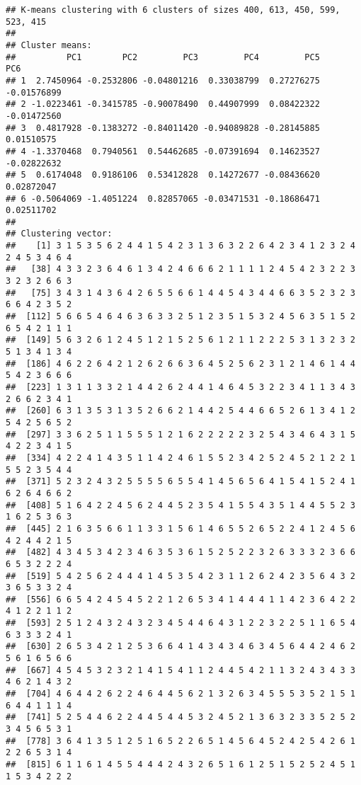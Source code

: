 \documentclass[
]{article}
\begin{document}
\begin{verbatim}
## K-means clustering with 6 clusters of sizes 400, 613, 450, 599, 523, 415
## 
## Cluster means:
##          PC1        PC2         PC3         PC4         PC5         PC6
## 1  2.7450964 -0.2532806 -0.04801216  0.33038799  0.27276275 -0.01576899
## 2 -1.0223461 -0.3415785 -0.90078490  0.44907999  0.08422322 -0.01472560
## 3  0.4817928 -0.1383272 -0.84011420 -0.94089828 -0.28145885  0.01510575
## 4 -1.3370468  0.7940561  0.54462685 -0.07391694  0.14623527 -0.02822632
## 5  0.6174048  0.9186106  0.53412828  0.14272677 -0.08436620  0.02872047
## 6 -0.5064069 -1.4051224  0.82857065 -0.03471531 -0.18686471  0.02511702
## 
## Clustering vector:
##    [1] 3 1 5 3 5 6 2 4 4 1 5 4 2 3 1 3 6 3 2 2 6 4 2 3 4 1 2 3 2 4 2 4 5 3 4 6 4
##   [38] 4 3 3 2 3 6 4 6 1 3 4 2 4 6 6 6 2 1 1 1 1 2 4 5 4 2 3 2 2 3 3 2 3 2 6 6 3
##   [75] 3 4 3 1 4 3 6 4 2 6 5 5 6 6 1 4 4 5 4 3 4 4 6 6 3 5 2 3 2 3 6 6 4 2 3 5 2
##  [112] 5 6 6 5 4 6 4 6 3 6 3 3 2 5 1 2 3 5 1 5 3 2 4 5 6 3 5 1 5 2 6 5 4 2 1 1 1
##  [149] 5 6 3 2 6 1 2 4 5 1 2 1 5 2 5 6 1 2 1 1 2 2 2 5 3 1 3 2 3 2 5 1 3 4 1 3 4
##  [186] 4 6 2 2 6 4 2 1 2 6 2 6 6 3 6 4 5 2 5 6 2 3 1 2 1 4 6 1 4 4 5 4 2 3 6 6 6
##  [223] 1 3 1 1 3 3 2 1 4 4 2 6 2 4 4 1 4 6 4 5 3 2 2 3 4 1 1 3 4 3 2 6 6 2 3 4 1
##  [260] 6 3 1 3 5 3 1 3 5 2 6 6 2 1 4 4 2 5 4 4 6 6 5 2 6 1 3 4 1 2 5 4 2 5 6 5 2
##  [297] 3 3 6 2 5 1 1 5 5 5 1 2 1 6 2 2 2 2 2 3 2 5 4 3 4 6 4 3 1 5 4 2 2 3 4 1 5
##  [334] 4 2 2 4 1 4 3 5 1 1 4 2 4 6 1 5 5 2 3 4 2 5 2 4 5 2 1 2 2 1 5 5 2 3 5 4 4
##  [371] 5 2 3 2 4 3 2 5 5 5 5 6 5 5 4 1 4 5 6 5 6 4 1 5 4 1 5 2 4 1 6 2 6 4 6 6 2
##  [408] 5 1 6 4 2 2 4 5 6 2 4 4 5 2 3 5 4 1 5 5 4 3 5 1 4 4 5 5 2 3 1 6 2 5 3 6 3
##  [445] 2 1 6 3 5 6 6 1 1 3 3 1 5 6 1 4 6 5 5 2 6 5 2 2 4 1 2 4 5 6 4 2 4 4 2 1 5
##  [482] 4 3 4 5 3 4 2 3 4 6 3 5 3 6 1 5 2 5 2 2 3 2 6 3 3 3 2 3 6 6 6 5 3 2 2 2 4
##  [519] 5 4 2 5 6 2 4 4 4 1 4 5 3 5 4 2 3 1 1 2 6 2 4 2 3 5 6 4 3 2 3 6 5 3 3 2 4
##  [556] 6 6 5 4 2 4 5 4 5 2 2 1 2 6 5 3 4 1 4 4 4 1 1 4 2 3 6 4 2 2 4 1 2 2 1 1 2
##  [593] 2 5 1 2 4 3 2 4 3 2 3 4 5 4 4 6 4 3 1 2 2 3 2 2 5 1 1 6 5 4 6 3 3 3 2 4 1
##  [630] 2 6 5 3 4 2 1 2 5 3 6 6 4 1 4 3 4 3 4 6 3 4 5 6 4 4 2 4 6 2 5 6 1 6 5 6 6
##  [667] 4 5 4 5 3 2 3 2 1 4 1 5 4 1 1 2 4 4 5 4 2 1 1 3 2 4 3 4 3 3 4 6 2 1 4 3 2
##  [704] 4 6 4 4 2 6 2 2 4 6 4 4 5 6 2 1 3 2 6 3 4 5 5 5 3 5 2 1 5 1 6 4 4 1 1 1 4
##  [741] 5 2 5 4 4 6 2 2 4 4 5 4 4 5 3 2 4 5 2 1 3 6 3 2 3 3 5 2 5 2 3 4 5 6 5 3 1
##  [778] 3 6 4 1 3 5 1 2 5 1 6 5 2 2 6 5 1 4 5 6 4 5 2 4 2 5 4 2 6 1 2 2 6 5 3 1 4
##  [815] 6 1 1 6 1 4 5 5 4 4 4 2 4 3 2 6 5 1 6 1 2 5 1 5 2 5 2 4 5 1 1 5 3 4 2 2 2

\end{verbatim}
\end{document}
